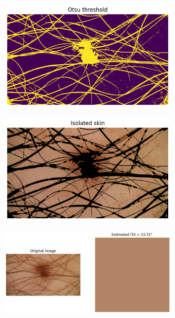 \begin{figure}[p]
\begin{subfigure}{0.90\textwidth}
         \caption{}
         \label{fig:ss_3}
		 \vspace{0.5em}
     \end{subfigure}
     \hfill
     \begin{subfigure}{0.45\textwidth}
         \centering
         \includegraphics[width=\textwidth]{figures/estimation/estimation_D.png}
         \caption{}
         \label{fig:ss_4}
		 \vspace{0.5em}
     \end{subfigure}
     \hfill
     \begin{subfigure}{0.45\textwidth}
         \centering
         \includegraphics[width=\textwidth]{figures/estimation/estimation_E.png}
         \caption{}
         \label{fig:ss_5}
		 \vspace{0.5em}
     \end{subfigure}
     \hfill
     \begin{subfigure}{0.90\textwidth}
         \centering
         \includegraphics[width=\textwidth]{figures/estimation/estimation_F.png}

\end{subfigure}
\end{figure}
